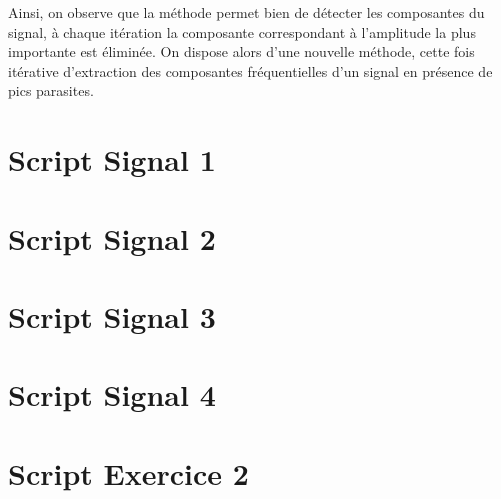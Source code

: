 \documentclass[12pt,a4paper,titlepage]{article}
\begin{document}
\begin{enumerate}
        Ainsi, on observe que la méthode permet bien de détecter les composantes du signal, à
        chaque itération la composante correspondant à l'amplitude la plus importante est éliminée.
        On dispose alors d'une nouvelle méthode, cette fois itérative d'extraction des composantes
        fréquentielles d'un signal en présence de pics parasites.

\end{enumerate}

\begin{appendices}

    \section{Script Signal 1}

    

    \section{Script Signal 2}

    

    \section{Script Signal 3}

    

    \section{Script Signal 4}

    

    \section{Script Exercice 2}

    

\end{appendices}
\end{document}
